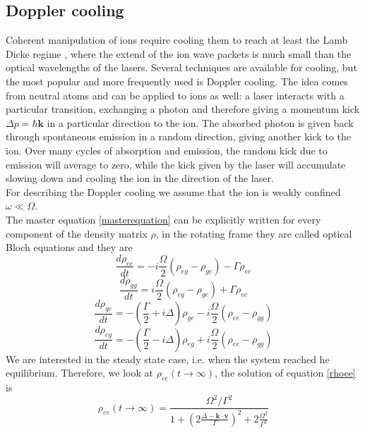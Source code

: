 \subsection{Doppler cooling}
\label{sec:doppler_cooling}
Coherent manipulation of ions require cooling them to reach at least the Lamb Dicke regime \cite{Wineland1998}, where the extend of the ion wave packets is much small than the optical wavelengths of the lasers. Several techniques are available for cooling, but the most popular and more frequently used is Doppler cooling. The idea comes from neutral atoms \cite{1975OptCo..13...68H} and can be applied to ions as well: a laser interacts with a particular transition, exchanging a photon and therefore giving a momentum kick $\Delta p = \hbar \mathbf{k}$ in a particular direction to the ion. The absorbed photon is given back through spontaneous emission in a random direction, giving another kick to the ion. Over many cycles of absorption and emission, the random kick due to emission will average to zero, while the kick given by the laser will accumulate slowing down and cooling the ion in the direction of the laser. \\
For describing the Doppler cooling we assume that the ion is weakly confined $\omega \ll \Omega$.\\
The master equation \eqref{masterequation} can be explicitly written for every component of the density matrix $\rho$, in the rotating frame they are called optical Bloch equations and they are
\begin{equation}
\label{rhoee}
\frac{d\rho_{ee}}{dt} = -i\frac{\Omega}{2}(\rho_{eg} - \rho_{ge}) - \Gamma \rho_{ee}
\end{equation}
\begin{equation}
\frac{d\rho_{gg}}{dt} = i\frac{\Omega}{2}(\rho_{eg} - \rho_{ge}) + \Gamma \rho_{ee}
\end{equation}
\begin{equation}
\frac{d\rho_{ge}}{dt} = -\left(\frac{\Gamma}{2}+i\Delta\right)\rho_{ge} -i\frac{\Omega}{2}(\rho_{ee} - \rho_{gg})
\end{equation}
\begin{equation}
\frac{d\rho_{eg}}{dt} = -\left(\frac{\Gamma}{2}-i\Delta\right)\rho_{eg}+i\frac{\Omega}{2}(\rho_{ee} - \rho_{gg})
\end{equation}
We are interested in the steady state case, i.e. when the system reached he equilibrium. Therefore, we look at $\rho_{ee}(t\to \infty) $, the solution of equation \eqref{rhoee} is
\begin{equation}
\rho_{ee}(t\to \infty) = \frac{\Omega^2/\Gamma^2}{1 + \left(2\frac{\Delta -\mathbf{k}\cdot \mathbf{v}}{\Gamma}\right)^2 + 2\frac{\Omega^2}{\Gamma^2}}
\end{equation}
